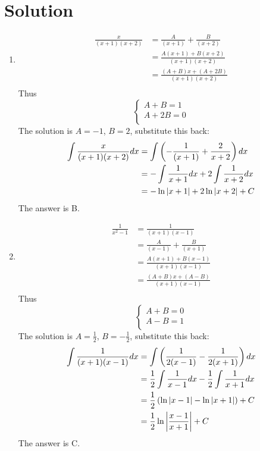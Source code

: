 \documentclass{article}
\numberwithin{equation}{section}
\begin{document}
\section{Solution}
\begin{enumerate}
    \item 
    \begin{align*}
        \frac{x}{(x+1)(x+2)} &= \frac{A}{(x+1)} + \frac{B}{(x+2)}\\
        &= \frac{A(x+1) + B(x+2)}{(x+1)(x+2)}\\
        &= \frac{(A+B)x + (A+2B)}{(x+1)(x+2)}\\
    \end{align*}
    Thus 
    \[
    \begin{cases}
        A + B = 1\\
        A + 2B = 0\\
    \end{cases}
    \]
    The solution is $A = -1$, $B=2$, substitute this back:
    \begin{align*}
        \int \frac{x}{(x+1)(x+2)} dx &= \int \left(-\frac{1}{(x+1)} + \frac{2}{x+2}\right)dx\\
        &= -\int \frac{1}{x+1}dx + 2\int \frac{1}{x+2} dx\\
        &= -\ln \abs{x+1} + 2\ln \abs{x+2} +C\\
    \end{align*}
    The answer is B.

    \item 
    \begin{align*}
    \frac{1}{x^2-1} &= \frac{1}{(x+1)(x-1)}\\
    &= \frac{A}{(x-1)} + \frac{B}{(x+1)}\\
    &= \frac{A(x+1) + B(x-1)}{(x+1)(x-1)}\\
    &= \frac{(A+B)x + (A-B)}{(x+1)(x-1)}\\
    \end{align*}
    Thus 
    \[
    \begin{cases}
        A + B = 0\\
        A - B = 1\\
    \end{cases}
    \]
    The solution is $A=\frac{1}{2}$, $B = -\frac{1}{2}$, substitute this back:
        \begin{align*}
        \int \frac{1}{(x+1)(x-1)} dx &= \int \left(\frac{1}{2(x-1)} - \frac{1}{2(x+1)}\right)dx\\
        &= \frac{1}{2}\int \frac{1}{x-1}dx - \frac{1}{2}\int \frac{1}{x+1} dx\\
        &= \frac{1}{2} \left(\ln \abs{x-1} -\ln \abs{x+1}\right)+C\\
        &= \frac{1}{2} \ln \abs{\frac{x-1}{x+1}} +C\\
    \end{align*}
    The answer is C.


\end{enumerate}
\end{document}
